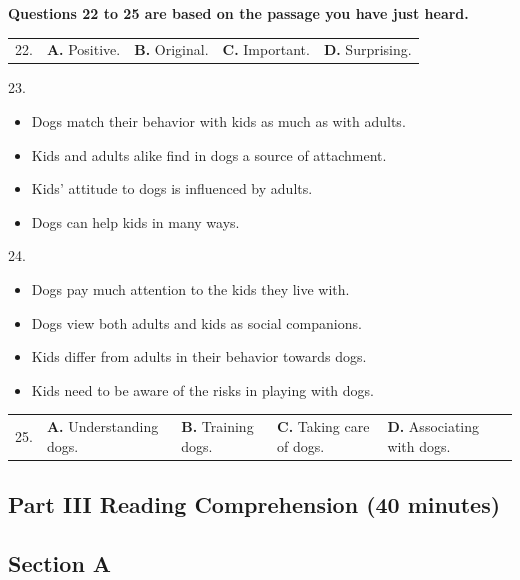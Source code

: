 \documentclass[UTF8,11pt]{ctexart}
\begin{document}
\textbf{Questions 22 to 25 are based on the passage you have just heard.}


\noindent\begin{tabularx}{\linewidth}{@{}lXXXX@{}}22. & \textbf{A.} Positive. & \textbf{B.} Original. & \textbf{C.} Important. & \textbf{D.} Surprising.\\\end{tabularx}\par

23.


\begin{itemize}[leftmargin=2em,itemsep=.2em,topsep=.4em]\item[A.] Dogs match their behavior with kids as much as with adults.
\item[B.] Kids and adults alike find in dogs a source of attachment.
\item[C.] Kids’ attitude to dogs is influenced by adults.
\item[D.] Dogs can help kids in many ways.
\end{itemize}

24.


\begin{itemize}[leftmargin=2em,itemsep=.2em,topsep=.4em]\item[A.] Dogs pay much attention to the kids they live with.
\item[B.] Dogs view both adults and kids as social companions.
\item[C.] Kids differ from adults in their behavior towards dogs.
\item[D.] Kids need to be aware of the risks in playing with dogs.
\end{itemize}

\noindent\begin{tabularx}{\linewidth}{@{}lXXXX@{}}25. & \textbf{A.} Understanding dogs. & \textbf{B.} Training dogs. & \textbf{C.} Taking care of dogs. & \textbf{D.} Associating with dogs.\\\end{tabularx}\par

\subsection*{\textbf{Part III Reading Comprehension (40 minutes)}}


\subsection*{\textbf{Section A}}
\end{document}
